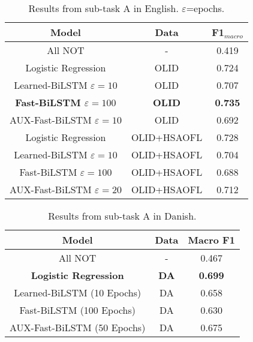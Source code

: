 \documentclass{article}
\begin{document}
\begin{table}
\centering
\small
\caption{Results from sub-task A in English.  $\varepsilon$=epochs.}
\begin{tabular}{c|c|c}
\textbf{Model}              & \textbf{Data} & \textbf{F1$_{macro}$} \\\hline
All NOT                     & -                  & 0.419             \\
Logistic Regression         & OLID\cite{zampieri2019predicting}               & 0.724             \\
Learned-BiLSTM $\varepsilon=10$    & OLID               & 0.707             \\
\textbf{Fast-BiLSTM $\varepsilon=100$}      & \textbf{OLID}               & \textbf{0.735}             \\
AUX-Fast-BiLSTM $\varepsilon=10$   & OLID               & 0.692             \\
Logistic Regression         & OLID+HSAOFL      & 0.728             \\
Learned-BiLSTM $\varepsilon=10$  & OLID+HSAOFL      & 0.704             \\
Fast-BiLSTM $\varepsilon=100$    & OLID+HSAOFL      & 0.688             \\
AUX-Fast-BiLSTM $\varepsilon=20$ & OLID+HSAOFL      & 0.712             \\
\end{tabular}
\label{table:subAEN}
\end{table}

\begin{table}
\centering
\small
\caption{Results from  sub-task A in Danish.}\label{table:subADA}
\begin{tabular}{c|c|c}
\textbf{Model}               & \textbf{Data} & \textbf{Macro F1} \\\hline
All NOT                      & -                  & 0.467             \\
\textbf{Logistic Regression} & \textbf{DA}        & \textbf{0.699}    \\
Learned-BiLSTM (10 Epochs)   & DA                 & 0.658             \\
Fast-BiLSTM (100 Epochs)     & DA                 & 0.630             \\
AUX-Fast-BiLSTM (50 Epochs)  & DA                 & 0.675             \\
\end{tabular}
\end{table}
\end{document}
